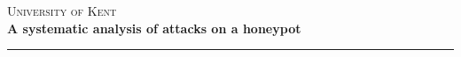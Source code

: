 \begin{titlepage}


\center

\textsc{\LARGE University of Kent}\\[5.5cm]
\textbf{\LARGE A systematic analysis of attacks on a honeypot}
\rule{\linewidth}{0.2mm}\\[0.3cm]
\\[2.0cm]
\\[0.2cm]
\\[0.2cm]


\end{titlepage}